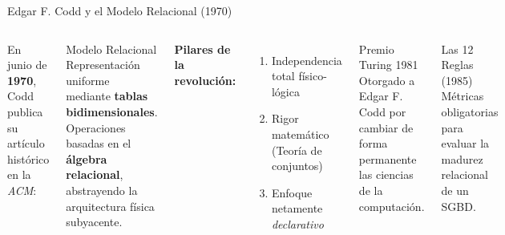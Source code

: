 \documentclass[12pt, aspectratio=169, UTF8]{beamer}
\begin{document}
\begin{frame}{Edgar F. Codd y el Modelo Relacional (1970)}
  \begin{columns}[T]
      En junio de \textbf{1970}, Codd publica su artículo histórico en la \emph{ACM}:
      \vspace{4pt}
      \begin{block}{Modelo Relacional}
        Representación uniforme mediante \textbf{tablas bidimensionales}. Operaciones basadas en el \textbf{álgebra relacional}, abstrayendo la arquitectura física subyacente.
      \end{block}
      \vspace{4pt}
      \textbf{Pilares de la revolución:}
      \begin{enumerate}
        \item Independencia total físico-lógica
        \item Rigor matemático (Teoría de conjuntos)
        \item Enfoque netamente \emph{declarativo}
      \end{enumerate}
      \begin{exampleblock}{Premio Turing 1981}
        Otorgado a Edgar F. Codd por cambiar de forma permanente las ciencias de la computación.
      \end{exampleblock}
      \begin{block}{Las 12 Reglas (1985)}
        Métricas obligatorias para evaluar la madurez relacional de un SGBD.
      \end{block}
  \end{columns}
\end{frame}
\end{document}
